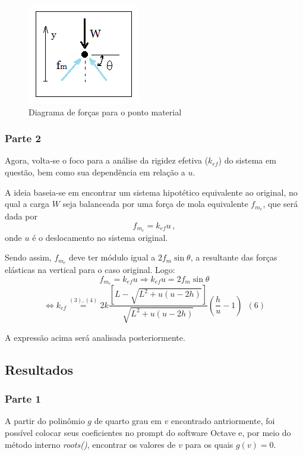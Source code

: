 \documentclass[a4paper, 12pt]{article}
\begin{document}
	\begin{figure}[!htb]
		\centering
		\includegraphics[scale=0.7]{img7.png}
		\caption{Diagrama de forças para o ponto material}
	\end{figure}
	
	\subsubsection{Parte 2}
	
	Agora, volta-se o foco para a análise da rigidez efetiva ($k_{ef}$) do sistema em questão, bem como sua dependência 
	em relação a $u$.
	
	A ideia baseia-se em encontrar um sistema hipotético equivalente ao original, no qual a carga $W$ seja balanceada 
	por uma força de mola equivalente $f_{m_e}$, que será dada por $$f_{m_e}=k_{ef}u\,,$$ onde $u$ é o deslocamento
	no sistema original.
	
	Sendo assim, $f_{m_e}$ deve ter módulo igual a $2f_m\sin \theta$, a resultante das forças elásticas na vertical 
	para o caso original. Logo: $$f_{m_e}=k_{ef}u \Longrightarrow k_{ef}u=2f_m\sin \theta$$
	$$\Longleftrightarrow k_{ef}\stackrel{(3),(4)}{=}2k\frac{\left[L-\sqrt{L^2+u(u-2h)}\right]}{
	\sqrt{L^2+u(u-2h)}}\left(\frac{h}{u}-1\right)\,\,\,(6)$$ $$ $$
	
	A expressão acima será analisada posteriormente.
	
	\newpage
	
	\subsection{Resultados}
	
	\subsubsection{Parte 1}
	
	A partir do polinômio $g$ de quarto grau em $v$ encontrado antriormente, foi possível colocar seus coeficientes no
	prompt do software Octave e, por meio do método interno \textit{roots()}, encontrar os valores de $v$ para os quais
	$g(v)=0$.
	
\end{document}

